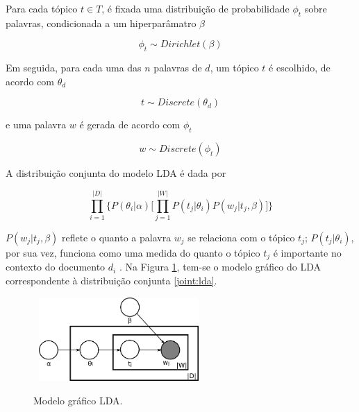 Para cada tópico \ensuremath{t \in T}, é fixada uma distribuição de probabilidade \ensuremath{\phi_t} sobre palavras, condicionada a um hiperparâmatro \ensuremath{\beta}

\begin{equation}
\label{lda:word}
\ensuremath{\phi_t \sim Dirichlet(\beta)}
\end{equation}

Em seguida, para cada uma das \ensuremath{n} palavras de \ensuremath{d}, um tópico \ensuremath{t} é escolhido, de acordo com \ensuremath{\theta_d}

\begin{equation}
\label{lda:topic-chosen}
\ensuremath{t \sim Discrete(\theta_d)}
\end{equation}

e uma palavra \ensuremath{w} é gerada de acordo com \ensuremath{\phi_t}

\begin{equation}
\label{lda:word-chosen}
\ensuremath{w \sim Discrete(\phi_t)}
\end{equation}

A distribuição conjunta do modelo LDA é dada por

\begin{equation}
\label{joint:lda}
\ensuremath{\prod_{i=1}^{|D|} \bigg\{P(\theta_i|\alpha)\bigg[\prod_{j=1}^{|W|}P(t_j|\theta_i)P(w_j|t_j,\beta)\bigg]\bigg\}}  
\end{equation}

\ensuremath{P(w_j|t_j,\beta)} reflete o quanto a palavra \ensuremath{w_j} se relaciona com o tópico \ensuremath{t_j}; \ensuremath{P(t_j|\theta_i)}, por sua vez, funciona como uma medida do quanto o tópico \ensuremath{t_j} é importante no contexto do documento \ensuremath{d_i} \cite{pnas}. Na Figura \ref{fig:lda}, tem-se o modelo gráfico do LDA correspondente à distribuição conjunta \ref{joint:lda}. 

\begin{figure}[t]
  \centering %
  \includegraphics[width=6.5cm, height=3.2cm]{Latent_Dirichlet_allocation.png}\\
  \caption{Modelo gráfico LDA.} %
  \label{fig:lda}
\end{figure}

